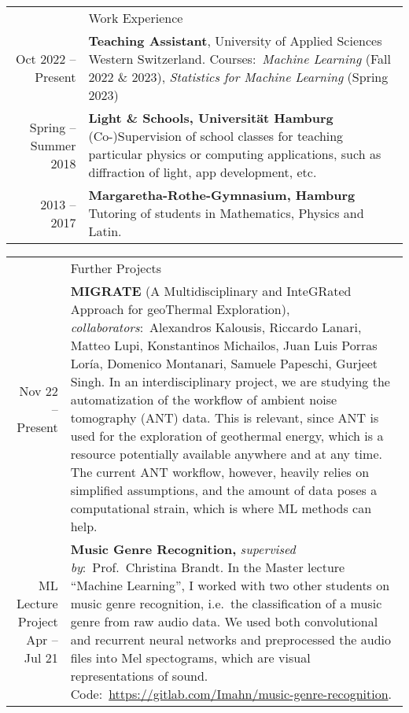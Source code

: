 \documentclass[11pt, a4paper]{article}
\newcommand{\headingfont}{\Large\color{OliveGreen}}
\newenvironment{SectionTable}[1]{
	\renewcommand*{\arraystretch}{1.7}
	\setlength{\tabcolsep}{10pt}
	\begin{longtable}{Rp{5.2in}} & #1 \\}
	{\end{longtable}\vspace{-.3cm}}
\begin{document}
	
	\begin{SectionTable}{\headingfont Work Experience}
		Oct 2022 -- Present & \textbf{Teaching Assistant}, University of Applied Sciences Western Switzerland. \newline Courses:~\textit{Machine Learning} (Fall 2022 \& 2023), \textit{Statistics for Machine Learning} (Spring 2023) \\
		
		Spring -- Summer 2018 & 
		\textbf{Light \& Schools, Universität Hamburg} \newline
		(Co-)Supervision of school classes for teaching particular physics or computing applications, such as diffraction of light, app development, etc.\\ 
		
		2013 -- 2017 & \textbf{Margaretha-Rothe-Gymnasium, Hamburg} \newline 
		Tutoring of students in Mathematics, Physics and Latin. 
	\end{SectionTable}

	\begin{SectionTable}{\headingfont Further Projects}
		Nov 22 -- Present & \textbf{MIGRATE} (A Multidisciplinary and InteGRated Approach for geoThermal Exploration), \textit{collaborators}:~Alexandros Kalousis, Riccardo Lanari, Matteo Lupi, Konstantinos Michailos,
        Juan Luis Porras Loría, Domenico Montanari, Samuele Papeschi, Gurjeet Singh. In an interdisciplinary project, we are studying the automatization of the workflow of ambient noise tomography (ANT) data. 
        This is relevant, since ANT is used for the exploration of geothermal energy, which is a resource potentially available anywhere and at any time. The current ANT workflow, however, heavily relies on 
        simplified assumptions, and the amount of data poses a computational strain, which is where ML methods can help.\\
        
        ML Lecture Project Apr -- Jul 21 & \textbf{Music Genre Recognition,} \textit{supervised by}:~Prof.~Christina Brandt. In the Master lecture \enquote{Machine Learning}, I worked with two other 
        students on music genre recognition, i.e.~the classification of a music genre from raw audio data. We used both convolutional and recurrent neural networks and preprocessed the audio files into 
        Mel spectograms, which are visual representations of sound. Code:~\url{https://gitlab.com/Imahn/music-genre-recognition}.
		
	\end{SectionTable}
    
\end{document}
